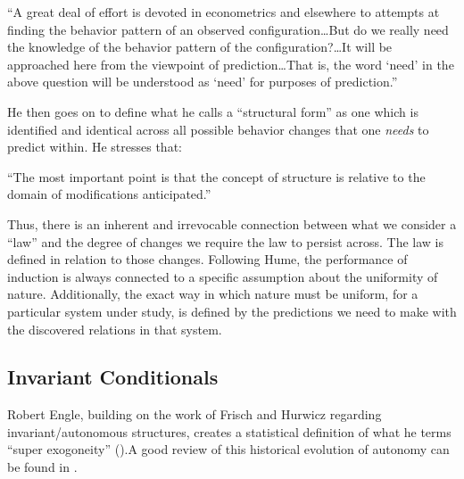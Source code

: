 \documentclass[a4paper,12pt]{article}
\begin{document}
\begin{displayquote}
``A great deal of effort is devoted in econometrics and elsewhere to attempts at finding the behavior pattern of an observed configuration\ldots But do we really need the knowledge of the behavior pattern of the configuration?\ldots It will be approached here from the viewpoint of prediction\ldots That is, the word `need' in the above question will be understood as `need' for purposes of prediction.''
\end{displayquote}


He then goes on to define what he calls a ``structural form'' as one which is identified and identical across all possible behavior changes that one \textit{needs} to predict within. He stresses that:

\begin{displayquote}
``The most important point is that the concept of structure is relative to the domain of modifications anticipated.''
\end{displayquote}

Thus, there is an inherent and irrevocable connection between what we consider a ``law'' and the degree of changes we require the law to persist across. The law is defined in relation to those changes. Following Hume, the performance of induction is always connected to a specific assumption about the uniformity of nature. Additionally, the exact way in which nature must be uniform, for a particular system under study, is defined by the predictions we need to make with the discovered relations in that system.


\subsection{Invariant Conditionals}

Robert Engle, building on the work of Frisch and Hurwicz regarding invariant/autonomous structures, creates a statistical definition of what he terms ``super exogoneity'' (\cite{Engle1983}).A good review of this historical evolution of autonomy can be found in \cite{Aldrich1989}.
\end{document}
